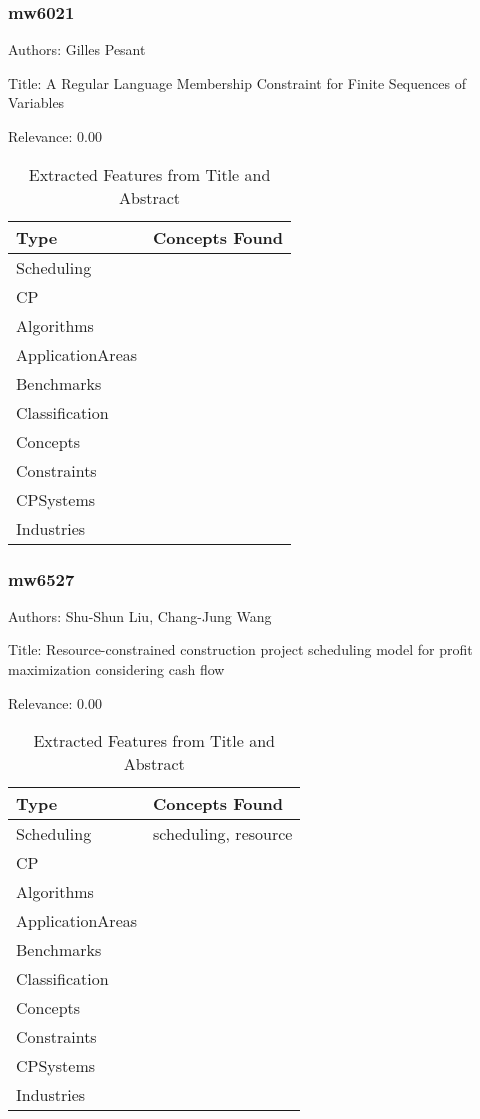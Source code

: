 \subsubsection{mw6021}
\label{mw:mw6021}

Authors: Gilles Pesant

Title: A Regular Language Membership Constraint for Finite Sequences of Variables

Relevance:  0.00

{\scriptsize
\begin{longtable}{p{2cm}p{20cm}}
\caption{Extracted Features from Title and Abstract}\\ \toprule
Type & Concepts Found\\ \midrule
\endhead
\bottomrule
\endfoot
Scheduling & \\ 
CP & \\ 
Algorithms & \\ 
ApplicationAreas & \\ 
Benchmarks & \\ 
Classification & \\ 
Concepts & \\ 
Constraints & \\ 
CPSystems & \\ 
Industries & \\ 
\end{longtable}
}



\subsubsection{mw6527}
\label{mw:mw6527}

Authors: Shu-Shun Liu, Chang-Jung Wang

Title: Resource-constrained construction project scheduling model for profit maximization considering cash flow

Relevance:  0.00

{\scriptsize
\begin{longtable}{p{2cm}p{20cm}}
\caption{Extracted Features from Title and Abstract}\\ \toprule
Type & Concepts Found\\ \midrule
\endhead
\bottomrule
\endfoot
Scheduling & scheduling, resource\\ 
CP & \\ 
Algorithms & \\ 
ApplicationAreas & \\ 
Benchmarks & \\ 
Classification & \\ 
Concepts & \\ 
Constraints & \\ 
CPSystems & \\ 
Industries & \\ 
\end{longtable}
}



